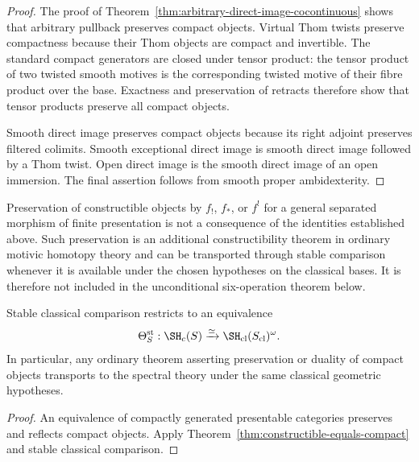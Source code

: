 \begin{proof}
The proof of Theorem~\ref{thm:arbitrary-direct-image-cocontinuous} shows
that arbitrary pullback preserves compact objects.  Virtual Thom twists
preserve compactness because their Thom objects are compact and invertible.
The standard compact generators are closed under tensor product: the tensor
product of two twisted smooth motives is the corresponding twisted motive of
their fibre product over the base.  Exactness and preservation of retracts
therefore show that tensor products preserve all compact objects.

Smooth direct image preserves compact objects because its right adjoint
preserves filtered colimits.  Smooth exceptional direct image is smooth
direct image followed by a Thom twist.  Open direct image is the smooth
direct image of an open immersion.  The final assertion follows from smooth
proper ambidexterity.
\end{proof}

\begin{remark}
\label{rem:nonformal-constructibility}
Preservation of constructible objects by \(f_!\), \(f_*\), or \(f^!\) for a
general separated morphism of finite presentation is not a consequence of
the identities established above.  Such preservation is an additional
constructibility theorem in ordinary motivic homotopy theory and can be
transported through stable comparison whenever it is available under the
chosen hypotheses on the classical bases.  It is therefore not included in
the unconditional six-operation theorem below.
\end{remark}

\begin{proposition}
\label{prop:constructible-classical-comparison}
Stable classical comparison restricts to an equivalence
\[
    \Theta_S^{\mathrm{st}}:
    \SH_c(S)
    \xrightarrow{\simeq}
    \SH_{\mathrm{cl}}(S_{\mathrm{cl}})^\omega.
\]
In particular, any ordinary theorem asserting preservation or duality of
compact objects transports to the spectral theory under the same classical
geometric hypotheses.
\end{proposition}

\begin{proof}
An equivalence of compactly generated presentable categories preserves and
reflects compact objects.  Apply
Theorem~\ref{thm:constructible-equals-compact} and stable classical
comparison.
\end{proof}


